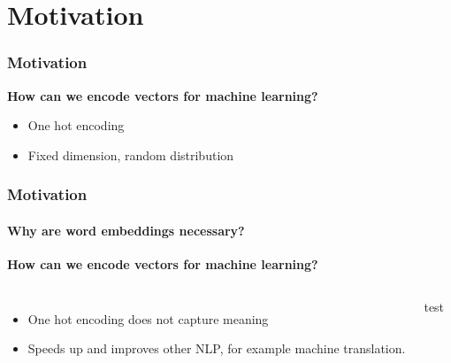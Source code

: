 
\section{Motivation}
\begin{frame}\frametitle{Motivation}
\textbf{How can we encode vectors for machine learning? }
\begin{itemize}
	\item One hot encoding
    \item Fixed dimension, random distribution
\end{itemize}
\end{frame}
\begin{frame}\frametitle {Motivation}
    \framesubtitle{Why are word embeddings necessary?}
    \textbf{How can we encode vectors for machine learning? }

          \begin{columns}

              \begin{itemize}
 \item One hot encoding does not capture meaning 
 
 \pause  \item  Speeds up and improves other NLP, for example machine translation. 
              \end{itemize}
test
   \end{columns}
\end{frame}
